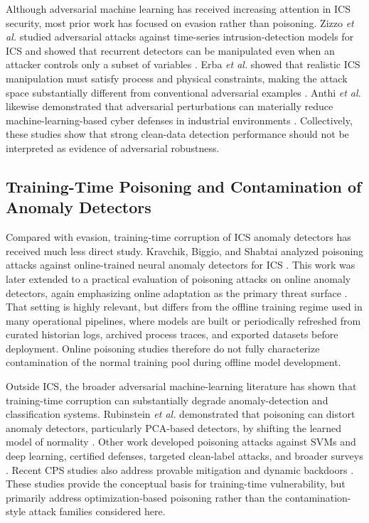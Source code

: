 \documentclass[10pt,conference]{IEEEtran}
\begin{document}
Although adversarial machine learning has received increasing attention in ICS security, most prior work has focused on evasion rather than poisoning. Zizzo \textit{et al.} studied adversarial attacks against time-series intrusion-detection models for ICS and showed that recurrent detectors can be manipulated even when an attacker controls only a subset of variables \cite{zizzo2020adversarial}. Erba \textit{et al.} showed that realistic ICS manipulation must satisfy process and physical constraints, making the attack space substantially different from conventional adversarial examples \cite{10.1145/3427228.3427660}. Anthi \textit{et al.} likewise demonstrated that adversarial perturbations can materially reduce machine-learning-based cyber defenses in industrial environments \cite{anthi2021adversarial}. Collectively, these studies show that strong clean-data detection performance should not be interpreted as evidence of adversarial robustness.

\subsection{Training-Time Poisoning and Contamination of Anomaly Detectors}

Compared with evasion, training-time corruption of ICS anomaly detectors has received much less direct study. Kravchik, Biggio, and Shabtai analyzed poisoning attacks against online-trained neural anomaly detectors for ICS \cite{kravchik2021poisoning}. This work was later extended to a practical evaluation of poisoning attacks on online anomaly detectors, again emphasizing online adaptation as the primary threat surface \cite{kravchik2022practical}. That setting is highly relevant, but differs from the offline training regime used in many operational pipelines, where models are built or periodically refreshed from curated historian logs, archived process traces, and exported datasets before deployment. Online poisoning studies therefore do not fully characterize contamination of the normal training pool during offline model development.

Outside ICS, the broader adversarial machine-learning literature has shown that training-time corruption can substantially degrade anomaly-detection and classification systems. Rubinstein \textit{et al.} demonstrated that poisoning can distort anomaly detectors, particularly PCA-based detectors, by shifting the learned model of normality \cite{rubinstein2009antidote}. Other work developed poisoning attacks against SVMs and deep learning, certified defenses, targeted clean-label attacks, and broader surveys \cite{biggio2012svm,munoz2017backgradient,steinhardt2017certified,shafahi2018poison,cina2022wild}. Recent CPS studies also address provable mitigation and dynamic backdoors \cite{abedzadeh2025mitigating,jiang2026dynamic}. These studies provide the conceptual basis for training-time vulnerability, but primarily address optimization-based poisoning rather than the contamination-style attack families considered here.
\end{document}
